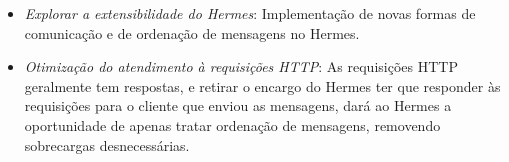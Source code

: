 \documentclass[12pt]{article}
\begin{document}
\begin{itemize}
\item \textit{Explorar a extensibilidade do Hermes}: Implementação de novas formas de comunicação e de ordenação de mensagens no Hermes.

\item \textit{Otimização do atendimento à requisições HTTP}: As requisições HTTP geralmente tem respostas, e retirar o encargo do Hermes ter que responder às requisições para o cliente que enviou as mensagens, dará ao Hermes a oportunidade de apenas tratar ordenação de mensagens, removendo sobrecargas desnecessárias.
\end{itemize}




\end{document}
